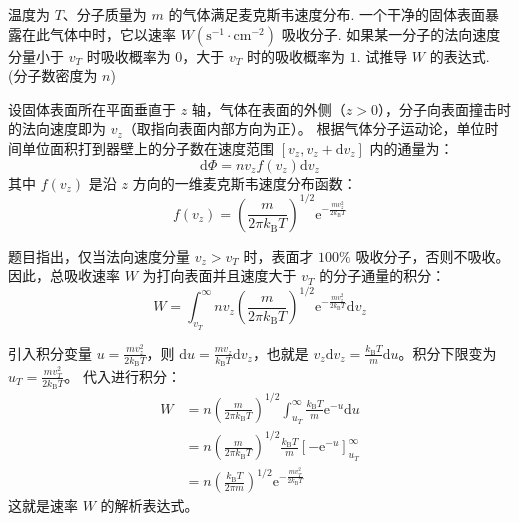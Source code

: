 \begin{exercise}\label{ex:13.9}
温度为 $T$、分子质量为 $m$ 的气体满足麦克斯韦速度分布. 一个干净的固体表面暴露在此气体中时，它以速率 $W(\mathrm{s^{-1}\cdot cm^{-2}})$ 吸收分子. 如果某一分子的法向速度分量小于 $v_T$ 时吸收概率为 $0$，大于 $v_T$ 时的吸收概率为 $1$. 试推导 $W$ 的表达式. (分子数密度为 $n$)
\end{exercise}
\begin{solution}
设固体表面所在平面垂直于 $z$ 轴，气体在表面的外侧（$z > 0$），分子向表面撞击时的法向速度即为 $v_z$（取指向表面内部方向为正）。
根据气体分子运动论，单位时间单位面积打到器壁上的分子数在速度范围 $[v_z, v_z + \mathrm{d}v_z]$ 内的通量为：
$$ \mathrm{d}\Phi = n v_z f(v_z) \mathrm{d}v_z $$
其中 $f(v_z)$ 是沿 $z$ 方向的一维麦克斯韦速度分布函数：
$$ f(v_z) = \left(\frac{m}{2\pi k_{\mathrm{B}} T}\right)^{1/2} \mathrm{e}^{-\frac{mv_z^2}{2k_{\mathrm{B}}T}} $$

题目指出，仅当法向速度分量 $v_z > v_T$ 时，表面才 $100\%$ 吸收分子，否则不吸收。因此，总吸收速率 $W$ 为打向表面并且速度大于 $v_T$ 的分子通量的积分：
$$ W = \int_{v_T}^{\infty} n v_z \left(\frac{m}{2\pi k_{\mathrm{B}} T}\right)^{1/2} \mathrm{e}^{-\frac{mv_z^2}{2k_{\mathrm{B}}T}} \mathrm{d}v_z $$

引入积分变量 $u = \frac{mv_z^2}{2k_{\mathrm{B}}T}$，则 $\mathrm{d}u = \frac{mv_z}{k_{\mathrm{B}}T} \mathrm{d}v_z$，也就是 $v_z \mathrm{d}v_z = \frac{k_{\mathrm{B}}T}{m} \mathrm{d}u$。积分下限变为 $u_T = \frac{mv_T^2}{2k_{\mathrm{B}}T}$。
代入进行积分：
\begin{align*}
    W &= n \left(\frac{m}{2\pi k_{\mathrm{B}} T}\right)^{1/2} \int_{u_T}^{\infty} \frac{k_{\mathrm{B}} T}{m} \mathrm{e}^{-u} \mathrm{d}u \\
      &= n \left(\frac{m}{2\pi k_{\mathrm{B}} T}\right)^{1/2} \frac{k_{\mathrm{B}} T}{m} \left[ -\mathrm{e}^{-u} \right]_{u_T}^{\infty} \\
      &= n \left(\frac{k_{\mathrm{B}} T}{2\pi m}\right)^{1/2} \mathrm{e}^{-\frac{mv_T^2}{2k_{\mathrm{B}}T}}
\end{align*}
这就是速率 $W$ 的解析表达式。
\end{solution}

